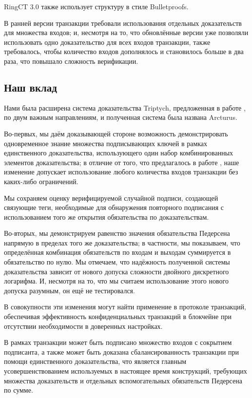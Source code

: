 \documentclass{article}
\theoremstyle{definition}
\begin{document}
RingCT 3.0 \cite{rct3} также использует структуру в стиле Bulletproofs.

В ранней версии транзакции требовали использования отдельных доказательств для множества входов; и, несмотря на то, что обновлённые версии уже позволяли использовать одно доказательство для всех входов транзакции, также требовалось, чтобы количество входов дополнялось и становилось больше в два раза, что повышало сложность верификации.


\subsection{Наш вклад}
Нами была расширена система доказательства Triptych, предложенная в работе \cite{triptych}, по двум важным направлениям, и полученная система была названа Arcturus.

Во-первых, мы даём доказывающей стороне возможность демонстрировать одновременное знание множества подписывающих ключей в рамках единственного доказательства, использующего один набор комбинированных элементов доказательства; в отличие от того, что предлагалось в работе \cite{rct3}, наше изменение допускает использование любого количества входов транзакции без каких-либо ограничений.

Мы сохраняем оценку верифицируемой случайной подписи, создающей связующие теги, необходимые для обнаружения повторного подписания с использованием того же открытия обязательства по доказательствам.

Во-вторых, мы демонстрируем равенство значения обязательства Педерсена напрямую в пределах того же доказательства; в частности, мы показываем, что определённая комбинация обязательств по входам и выходам суммируется в обязательство по нулю. Мы отмечаем, что надёжность полученной системы доказательства зависит от нового допуска сложности двойного дискретного логарифма. И, несмотря на то, что мы считаем использование этого нового допуска разумным, он ещё не тестировался.

В совокупности эти изменения могут найти применение в протоколе транзакций, обеспечивая эффективность конфиденциальных транзакций в блокчейне при отсутствии необходимости в доверенных настройках.

В рамках транзакции может быть подписано множество входов с сокрытием подписанта, а также может быть доказана сбалансированность транзакции при помощи единственного доказательства, что является главным усовершенствованием используемых в настоящее время конструкций, требующих множества доказательств и отдельных вспомогательных обязательств Педерсена по сумме.
\end{document}
